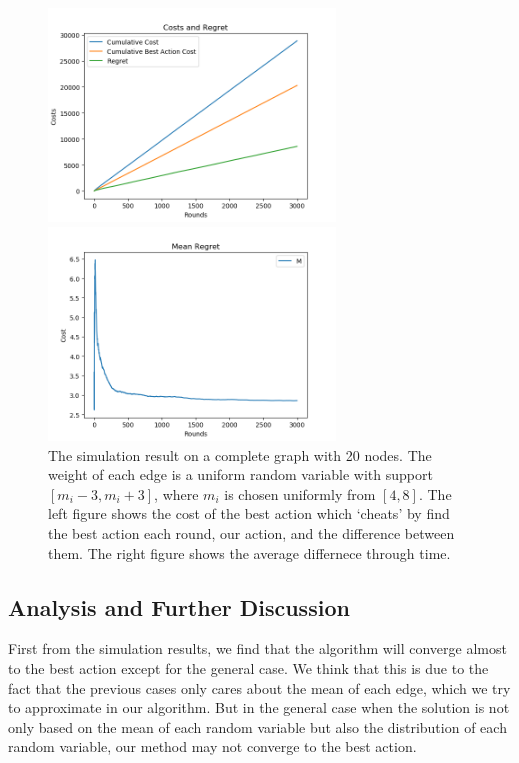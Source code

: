 \documentclass{article}
\theoremstyle{plain}
\theoremstyle{definition}
\theoremstyle{remark}
\begin{document}
    \begin{figure}[htbp!]
        \begin{minipage}[h]{0.5\linewidth}
            \centering
            \includegraphics[width=3in]{general-cost-regret-uni.png}
        \end{minipage}
        \begin{minipage}[h]{0.5\linewidth}
            \centering
            \includegraphics[width=3in]{general-mean-regret-uni.png}
        \end{minipage}
        \caption{The simulation result on a complete graph with 20 nodes. The weight of each edge is a uniform random variable with support $[m_i-3,m_i+3]$, where $m_i$ is chosen uniformly from $[4,8]$. The left figure shows the cost of the best action which `cheats' by find the best action each round, our action, and the difference between them. The right figure shows the average differnece through time.}
        \label{general-uni}
    \end{figure}

    \subsection{Analysis and Further Discussion}
    First from the simulation results, we find that the algorithm will converge almost to the best action except for the general case. We think that this is due to the fact that the previous cases only cares about the mean of each edge, which we try to approximate in our algorithm. But in the general case when the solution is not only based on the mean of each random variable but also the distribution of each random variable, our method may not converge to the best action.\\
    
\end{document}
